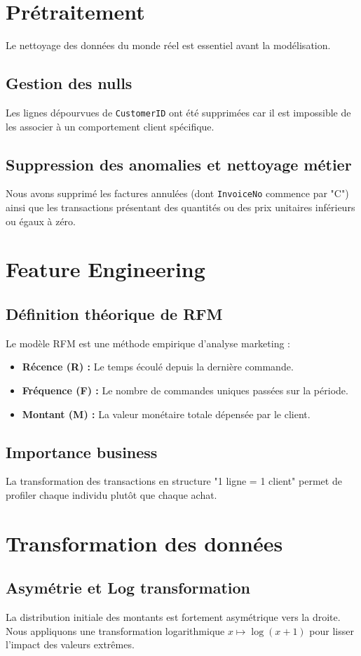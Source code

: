 \documentclass[12pt,a4paper]{article}
\begin{document}
\section{Prétraitement}
Le nettoyage des données du monde réel est essentiel avant la modélisation.
\subsection{Gestion des nulls}
Les lignes dépourvues de \texttt{CustomerID} ont été supprimées car il est impossible de les associer à un comportement client spécifique.
\subsection{Suppression des anomalies et nettoyage métier}
Nous avons supprimé les factures annulées (dont \texttt{InvoiceNo} commence par "C") ainsi que les transactions présentant des quantités ou des prix unitaires inférieurs ou égaux à zéro.

\section{Feature Engineering}
\subsection{Définition théorique de RFM}
Le modèle RFM est une méthode empirique d'analyse marketing :
\begin{itemize}
    \item \textbf{Récence (R) :} Le temps écoulé depuis la dernière commande.
    \item \textbf{Fréquence (F) :} Le nombre de commandes uniques passées sur la période.
    \item \textbf{Montant (M) :} La valeur monétaire totale dépensée par le client.
\end{itemize}
\subsection{Importance business}
La transformation des transactions en structure "1 ligne = 1 client" permet de profiler chaque individu plutôt que chaque achat.

\section{Transformation des données}
\subsection{Asymétrie et Log transformation}
La distribution initiale des montants est fortement asymétrique vers la droite. Nous appliquons une transformation logarithmique $x \mapsto \log(x+1)$ pour lisser l'impact des valeurs extrêmes.
\end{document}
